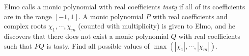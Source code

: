Elmo calls a monic polynomial with real coefficients \textit{tasty} if all of its coefficients are in the range $[-1,1]$. A monic polynomial  $P$ with real coefficients and complex roots $\chi_1,\cdots,\chi_m$ (counted with multiplicity) is given to Elmo, and he discovers that there does not exist a monic polynomial $Q$ with real coefficients such that $PQ$ is tasty. Find all possible values of $\max\left(|\chi_1|,\cdots,|\chi_m|\right)$.

